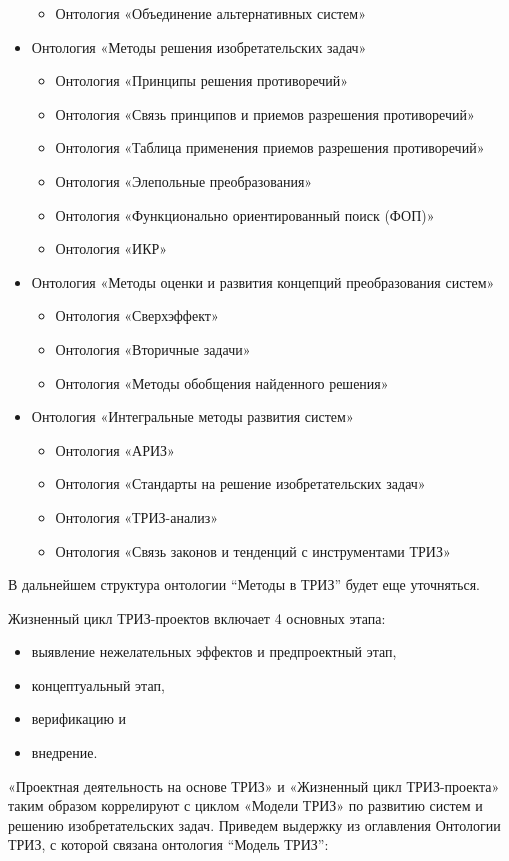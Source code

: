 \documentclass[11pt,a4paper]{article}
\begin{document}
\begin{itemize}
\begin{itemize}[noitemsep]
  \item Онтология «Объединение альтернативных систем»
  \end{itemize}
\item Онтология «Методы решения изобретательских задач»
  \begin{itemize}[noitemsep]
  \item Онтология «Принципы решения противоречий»
  \item Онтология «Связь принципов и приемов разрешения противоречий»
  \item Онтология «Таблица применения приемов разрешения противоречий»
  \item Онтология «Элепольные преобразования»
  \item Онтология «Функционально ориентированный поиск (ФОП)»
  \item Онтология «ИКР»
  \end{itemize}
\item Онтология «Методы оценки и развития концепций преобразования систем»
  \begin{itemize}[noitemsep]
  \item Онтология «Сверхэффект»
  \item Онтология «Вторичные задачи»
  \item Онтология «Методы обобщения найденного решения»
  \end{itemize}
\item Онтология «Интегральные методы развития систем»
  \begin{itemize}[noitemsep]
  \item Онтология «АРИЗ»
  \item Онтология «Стандарты на решение изобретательских задач»
  \item Онтология «ТРИЗ-анализ»
  \item Онтология «Связь законов и тенденций с инструментами ТРИЗ»
  \end{itemize}
\end{itemize}
В дальнейшем структура онтологии “Методы в ТРИЗ” будет еще уточняться.

Жизненный цикл ТРИЗ-проектов включает 4 основных этапа:
\begin{itemize}[noitemsep]
\item выявление нежелательных эффектов и предпроектный этап,
\item концептуальный этап,
\item верификацию и
\item внедрение.
\end{itemize}
«Проектная деятельность на основе ТРИЗ» и «Жизненный цикл ТРИЗ-проекта» таким
образом коррелируют с циклом «Модели ТРИЗ» по развитию систем и решению
изобретательских задач. Приведем выдержку из оглавления Онтологии ТРИЗ, с
которой связана онтология “Модель ТРИЗ”:
\end{document}
